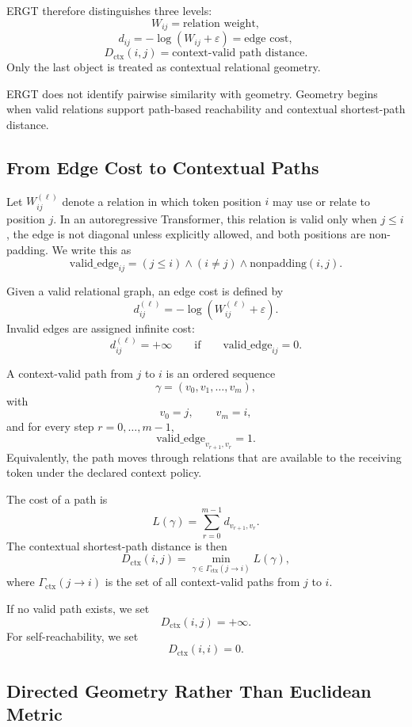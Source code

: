 \documentclass[11pt]{article}
\begin{document}
ERGT therefore distinguishes three levels:
\[
W_{ij}=\text{relation weight},
\]
\[
d_{ij}=-\log(W_{ij}+\varepsilon)=\text{edge cost},
\]
\[
D_{\mathrm{ctx}}(i,j)=\text{context-valid path distance}.
\]
Only the last object is treated as contextual relational geometry.

\begin{ergtclaim}
ERGT does not identify pairwise similarity with geometry. Geometry begins when valid relations support path-based reachability and contextual shortest-path distance.
\end{ergtclaim}

\subsection{From Edge Cost to Contextual Paths}

Let $W_{ij}^{(\ell)}$ denote a relation in which token position $i$ may use or relate to position $j$. In an autoregressive Transformer, this relation is valid only when $j\leq i$, the edge is not diagonal unless explicitly allowed, and both positions are non-padding. We write this as
\[
\mathrm{valid\_edge}_{ij}
=
(j\leq i)\land(i\neq j)\land\mathrm{nonpadding}(i,j).
\]

Given a valid relational graph, an edge cost is defined by
\[
d_{ij}^{(\ell)}=-\log(W_{ij}^{(\ell)}+\varepsilon).
\]
Invalid edges are assigned infinite cost:
\[
d_{ij}^{(\ell)}=+\infty
\qquad
\text{if}
\qquad
\mathrm{valid\_edge}_{ij}=0.
\]

A context-valid path from $j$ to $i$ is an ordered sequence
\[
\gamma=(v_0,v_1,\ldots,v_m),
\]
with
\[
v_0=j,
\qquad
v_m=i,
\]
and for every step $r=0,\ldots,m-1$,
\[
\mathrm{valid\_edge}_{v_{r+1},v_r}=1.
\]
Equivalently, the path moves through relations that are available to the receiving token under the declared context policy.

The cost of a path is
\[
L(\gamma)
=
\sum_{r=0}^{m-1} d_{v_{r+1},v_r}.
\]
The contextual shortest-path distance is then
\[
D_{\mathrm{ctx}}(i,j)
=
\min_{\gamma\in\Gamma_{\mathrm{ctx}}(j\to i)} L(\gamma),
\]
where $\Gamma_{\mathrm{ctx}}(j\to i)$ is the set of all context-valid paths from $j$ to $i$.

If no valid path exists, we set
\[
D_{\mathrm{ctx}}(i,j)=+\infty.
\]
For self-reachability, we set
\[
D_{\mathrm{ctx}}(i,i)=0.
\]

\subsection{Directed Geometry Rather Than Euclidean Metric}
\end{document}
